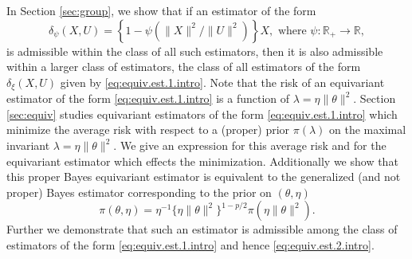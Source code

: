 \documentclass[preprint,11pt]{imsart}
\numberwithin{equation}{section}
\theoremstyle{plain}
\theoremstyle{definition}
\theoremstyle{remark}
\begin{document}
In Section \ref{sec:group},
we show that if an estimator of the form
\begin{equation}\label{eq:equiv.est.1.intro}
 \delta_{\psi}(X,U)=\left\{1-\psi(\|X\|^2/\|U\|^2)\right\}X,
 \text{ where }\psi:\mathbb{R}_+\to\mathbb{R},
\end{equation}
is admissible within the class of all such estimators, then it is also
admissible within a larger class of estimators, the class of all estimators of the form
$\delta_{\xi}(X,U)$ given by \eqref{eq:equiv.est.1.intro}.
Note that the risk of an equivariant estimator of the form \eqref{eq:equiv.est.1.intro}
is a function of $\lambda=\eta\|\theta\|^2$.
Section \ref{sec:equiv} studies equivariant estimators of the form \eqref{eq:equiv.est.1.intro}
which minimize the average risk with respect to a (proper) prior $\pi(\lambda)$ on
the maximal invariant $\lambda=\eta\|\theta\|^2$.
We  give an expression for this average risk and for the equivariant estimator
which effects the minimization. Additionally we show that this proper Bayes equivariant
estimator is equivalent to the generalized (and not proper) Bayes estimator
corresponding to the prior on $(\theta,\eta)$
\begin{equation*}
 \pi(\theta,\eta)=\eta^{-1}\{\eta\|\theta\|^2\}^{1-p/2}\pi(\eta\|\theta\|^2).
\end{equation*}
Further we demonstrate that such an estimator is admissible among the class of
estimators of the form \eqref{eq:equiv.est.1.intro} and hence \eqref{eq:equiv.est.2.intro}.
\end{document}
